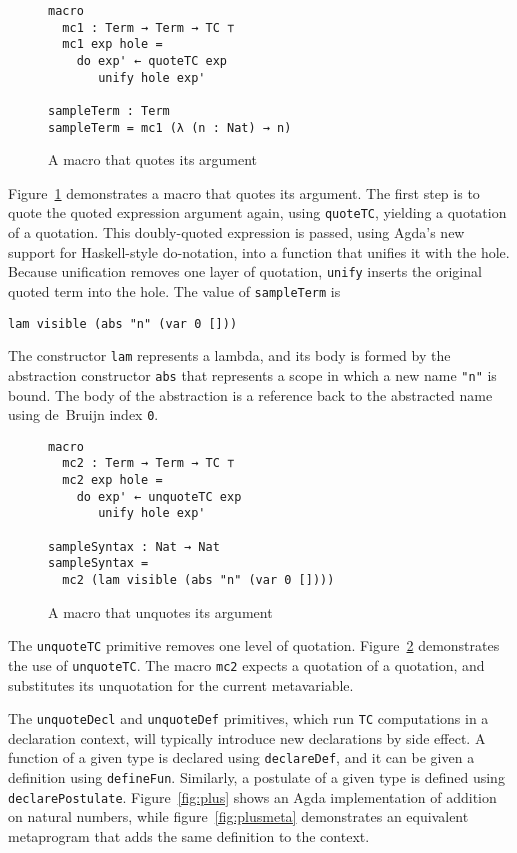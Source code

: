 \documentclass[sigplan,10pt]{acmart}
\begin{document}
\begin{figure}
\begin{Verbatim}
macro
  mc1 : Term → Term → TC ⊤
  mc1 exp hole =
    do exp' ← quoteTC exp
       unify hole exp'

sampleTerm : Term
sampleTerm = mc1 (λ (n : Nat) → n)
\end{Verbatim}
\caption{A macro that quotes its argument}
\label{fig:macro1}
\end{figure}

Figure~\ref{fig:macro1} demonstrates a macro that quotes its argument.
The first step is to quote the quoted expression argument again, using \texttt{quoteTC}, yielding a quotation of a quotation.
This doubly-quoted expression is passed, using Agda's new support for Haskell-style do-notation, into a function that unifies it with the hole.
Because unification removes one layer of quotation, \texttt{unify} inserts the original quoted term into the hole.
The value of {\tt sampleTerm} is
\begin{center}
\begin{BVerbatim}
lam visible (abs "n" (var 0 []))
\end{BVerbatim}
\end{center}
The constructor \texttt{lam} represents a lambda, and its body is formed by the abstraction constructor \texttt{abs} that represents a scope in which a new name \texttt{"n"} is bound.
The body of the abstraction is a reference back to the abstracted name using de~Bruijn index \texttt{0}.

\begin{figure}
\centering
\begin{Verbatim}
macro
  mc2 : Term → Term → TC ⊤
  mc2 exp hole =
    do exp' ← unquoteTC exp
       unify hole exp'

sampleSyntax : Nat → Nat
sampleSyntax =
  mc2 (lam visible (abs "n" (var 0 [])))
\end{Verbatim}
\caption{A macro that unquotes its argument}
\label{fig:macro2}
\end{figure}

The {\tt unquoteTC} primitive removes one level of quotation.
Figure~\ref{fig:macro2} demonstrates the use of \texttt{unquoteTC}.
The macro {\tt mc2} expects a quotation of a quotation, and substitutes its unquotation for the current metavariable.

The {\tt unquoteDecl} and {\tt unquoteDef} primitives, which run \texttt{TC} computations in a declaration context, will typically introduce new declarations by side effect.
A function of a given type is declared using {\tt declareDef}, and it can be given a definition using {\tt defineFun}.
Similarly, a postulate of a given type is defined using {\tt declarePostulate}.
Figure~\ref{fig:plus} shows an Agda implementation of addition on natural numbers, while figure~\ref{fig:plusmeta} demonstrates an equivalent metaprogram that adds the same definition to the context.
\end{document}
